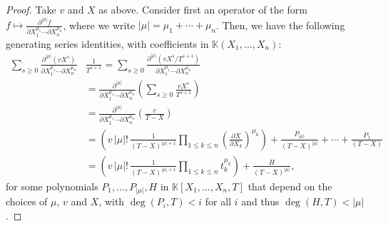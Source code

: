 \documentclass[12pt]{article}
\newcommand{\lf}{X}
\def\K{\mathbb{K}}
\def\K {\ensuremath{\mathbb{K}}}
\begin{document}
\begin{proof}
  Take $v$ and $\lf$ as above. Consider first an operator of the form $f
  \mapsto \frac{ \partial^{|\mu|} f} {\partial X_1^{\mu_1} \cdots
    \partial X_n^{\mu_n}}$, where we write
  $|\mu|=\mu_1+\cdots+\mu_n$. Then, we have the following generating
  series identities, with coefficients in $\K(X_1,\dots,X_n)$:
  \begin{align*}
    \sum_{s \ge 0} 
    \frac{ \partial^{|\mu|} ( v \lf^s )} {\partial X_1^{\mu_1} \cdots
      \partial X_n^{\mu_n}}
    &\frac{1}{T^{s+1}} 
    =  \sum_{s \ge 0} 
    \frac{ \partial^{|\mu|} (v \lf^s/T^{s+1})} {\partial X_1^{\mu_1} \cdots
      \partial X_n^{\mu_n}}\\
    &=  
    \frac{ \partial^{|\mu|} } {\partial X_1^{\mu_1} \cdots
      \partial X_n^{\mu_n}}
    \left (\sum_{s \ge 0} \frac{v \lf^s}{T^{s+1}}\right ) \\
    &= \frac{ \partial^{|\mu|} } {\partial X_1^{\mu_1} \cdots
      \partial X_n^{\mu_n}}
    \left (\frac v{T-\lf} \right ) \\
    &= \left (v\, |\mu|!\,    \frac {1}{(T-\lf)^{|\mu|+1}} \prod_{1 \le k \le n} 
    \left (\frac{ \partial \lf} {\partial X_k} \right)^{\mu_k}
\right ) + \frac{P_{|\mu|}}{(T-\lf)^{|\mu|}} + \cdots + \frac{P_{1}}{(T-\lf)}\\
    &=\left ( v\, |\mu|!\,    \frac {1}{(T-\lf)^{|\mu|+1}} \prod_{1 \le k \le n} 
    t_k^{\mu_k}
\right ) + \frac{H}{(T-\lf)^{|\mu|}},
  \end{align*}
  for some polynomials $P_1,\dots,P_{|\mu|},H$ in $\K[X_1,\dots,X_n,T]$ that
  depend on the choices of $\mu$, $v$ and $X$, with $\deg(P_i,T) < i$
  for all $i$ and thus $\deg(H,T) < |\mu|$.
  

\end{proof}
\end{document}
